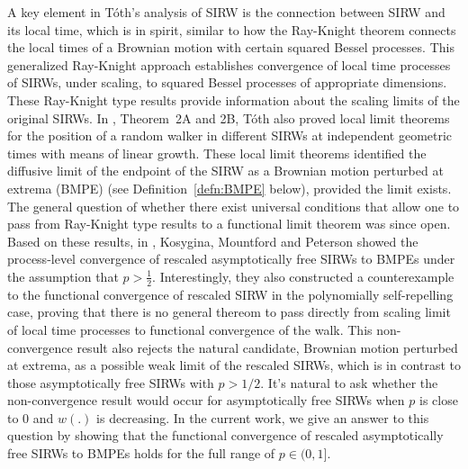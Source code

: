 \documentclass[EJP]{ejpecp} %
\begin{document}
A key element in T\'oth's analysis of SIRW is the connection between SIRW and its local time, which is in spirit, similar to how the Ray-Knight theorem connects the local times of a Brownian motion with certain squared Bessel processes. 
This generalized Ray-Knight approach establishes convergence of local time processes of SIRWs, under scaling, to squared Bessel processes of appropriate dimensions. These Ray-Knight type results provide information about the scaling limits of the original SIRWs.
In \cite{T96}, Theorem~2A and 2B, T\'oth also proved local limit theorems for the position of a random walker in different SIRWs at independent geometric times with means of linear growth. 
These local limit theorems identified the diffusive limit of the endpoint of the SIRW as a Brownian motion perturbed at extrema (BMPE) (see Definition~\ref{defn:BMPE} below), provided the limit exists. 
The general question of whether there exist universal conditions that allow one to pass from Ray-Knight type results to a functional limit theorem was since open.
Based on these results, in \cite{KMP23}, Kosygina, Mountford and Peterson showed the process-level convergence of rescaled asymptotically free SIRWs to BMPEs under the assumption that $p > \frac{1}{2}$. Interestingly, they also constructed a counterexample to the functional convergence of rescaled SIRW in the polynomially self-repelling case, proving that there is no general thereom to pass directly from scaling limit of local time processes to functional convergence of the walk.
This non-convergence result also rejects the natural candidate, Brownian motion perturbed at extrema, as a possible weak limit of the rescaled SIRWs, which is in contrast to those asymptotically free SIRWs with $p>1/2$. It's natural to ask whether the non-convergence result would occur for asymptotically free SIRWs when $p$ is close to $0$ and $w(.)$ is decreasing.
In the current work, we give an answer to this question by showing that the functional convergence of rescaled asymptotically free SIRWs to BMPEs holds for the full range of $p \in (0,1]$.

\end{document}
